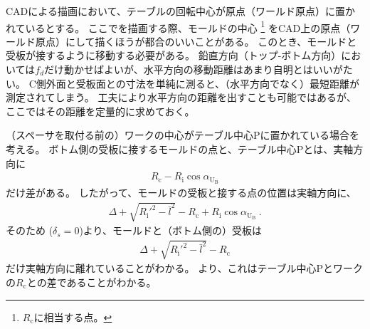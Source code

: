 

CADによる描画において、テーブルの回転中心が原点（ワールド原点）に置かれているとする。
ここでを描画する際、モールドの中心
\footnote{$R_\mathrm c$に相当する点。}\relax
をCAD上の原点（ワールド原点）にして描くほうが都合のいいことがある。
このとき、モールドと受板が接するように移動する必要がある。
鉛直方向（トップ-ボトム方向）においては$f_d$だけ動かせばよいが、水平方向の移動距離はあまり自明とはいいがたい。
C側外面と受板面との寸法を単純に測ると、（水平方向でなく）最短距離が測定されてしまう。
工夫により水平方向の距離を出すことも可能ではあるが、ここではその距離を定量的に求めておく。



（スペーサを取付る前の）ワークの中心がテーブル中心Pに置かれている場合を考える。
ボトム側の受板に接するモールドの点と、テーブル中心Pとは、実軸方向に
\begin{align*}
  R_\mathrm c-R_\mathrm i\cos\alpha_{\mathrm U_\mathrm B}
\end{align*}
だけ差がある。
したがって、モールドの受板と接する点の位置は実軸方向に、
\begin{align*}
  \Delta+\sqrt{R_\mathrm i'^2-\bar l^2}-R_\mathrm c+R_\mathrm i\cos\alpha_{\mathrm U_\mathrm B}\ .
\end{align*}
そのため ($\delta_s = 0$)より、モールドと（ボトム側の）受板は
\begin{align*}
  \Delta+\sqrt{R_\mathrm i'^2-\bar l^2}-R_\mathrm c
\end{align*}
だけ実軸方向に離れていることがわかる。
より、これはテーブル中心Pとワークの\CenterCurvature$R_\mathrm c$との差であることがわかる。



